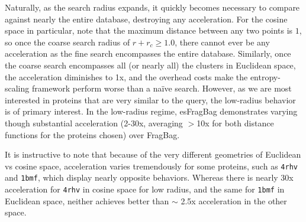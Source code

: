 \documentclass[review,preprint,12pt]{elsarticle}
\theoremstyle{definition}
\theoremstyle{remark}
\numberwithin{equation}{section}
\begin{document}
Naturally, as the search radius expands, it quickly becomes necessary to compare against nearly the entire database, destroying any acceleration.
For the cosine space in particular, note that the maximum distance between any two points is $1$, so once the coarse search radius of $r+r_c \ge 1.0$, there cannot ever be any acceleration as the fine search encompasses the entire database.
Similarly, once the coarse search encompasses all (or nearly all) the clusters in Euclidean space, the acceleration diminishes to 1x, and the overhead costs make the entropy-scaling framework perform worse than a na\"ive search.
However, as we are most interested in proteins that are very similar to the query, the low-radius behavior is of primary interest.
In the low-radius regime, esFragBag demonstrates varying though substantial acceleration (2-30x, averaging $>$10x for both distance functions for the proteins chosen) over FragBag.

It is instructive to note that because of the very different geometries of Euclidean vs cosine space, acceleration varies tremendously for some proteins, such as \texttt{4rhv} and \texttt{1bmf}, which display nearly opposite behaviors.
Whereas there is nearly 30x acceleration for \texttt{4rhv} in cosine space for low radius, and the same for \texttt{1bmf} in Euclidean space, neither achieves better than $\sim$ 2.5x acceleration in the other space.
\end{document}
